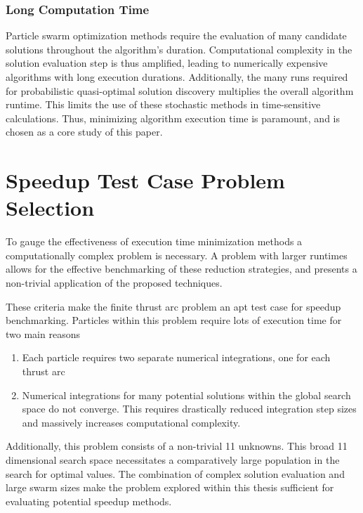 \subsubsection{Long Computation Time}

\noindent Particle swarm optimization methods require the evaluation of many candidate solutions throughout the algorithm's duration.
Computational complexity in the solution evaluation step is thus amplified, leading to numerically 
expensive algorithms with long execution durations.
Additionally, the many runs required for probabilistic quasi-optimal solution discovery multiplies the overall
algorithm runtime. This limits the use of these stochastic methods 
in time-sensitive calculations. Thus, minimizing algorithm execution time is paramount,
and is chosen as a core study of this paper. \newline

\section{Speedup Test Case Problem Selection} \label{problemSelection}

\noindent To gauge the effectiveness of execution time minimization methods a computationally complex problem is 
necessary. A problem with larger runtimes allows for the effective benchmarking of these reduction strategies,
and presents a non-trivial application of the proposed techniques.\newline

\noindent These criteria make the finite thrust arc problem an apt test case for speedup benchmarking. 
Particles within this problem require lots of execution time for two main reasons

\begin{enumerate}
    \item Each particle requires two separate numerical integrations, one for each thrust arc
    \item Numerical integrations for many potential solutions within the global search space do not converge.
    This requires drastically reduced integration step sizes and massively increases computational complexity. 
\end{enumerate}

\noindent Additionally, this problem consists of a non-trivial 11 unknowns. This broad 11 dimensional search space necessitates 
a comparatively large population
in the search for optimal values. The combination of complex solution evaluation and large swarm sizes make the problem explored within
this thesis sufficient for evaluating potential speedup methods.


